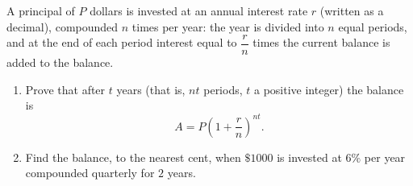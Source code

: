 A principal of $P$ dollars is invested at an annual interest rate $r$ (written as a decimal), compounded $n$ times per year: the year is divided into $n$ equal periods, and at the end of each period interest equal to $\dfrac {r}{n}$ times the current balance is added to the balance.
\begin{enumerate}
\item[(a)] Prove that after $t$ years (that is, $nt$ periods, $t$ a positive integer) the balance is
\[A=P\left(1+\dfrac {r}{n}\right)^{nt}.\]
\item[(b)] Find the balance, to the nearest cent, when $\$1000$ is invested at $6\%$ per year compounded quarterly for $2$ years.
\end{enumerate}
